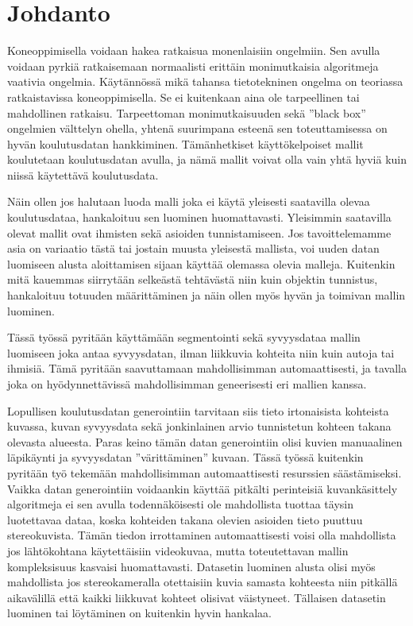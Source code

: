 \chapter{Johdanto}%
\label{ch:johdanto}

Koneoppimisella voidaan hakea ratkaisua monenlaisiin ongelmiin.
Sen avulla voidaan pyrkiä ratkaisemaan normaalisti erittäin monimutkaisia algoritmeja vaativia ongelmia.
Käytännössä mikä tahansa tietotekninen ongelma on teoriassa ratkaistavissa koneoppimisella.
Se ei kuitenkaan aina ole tarpeellinen tai mahdollinen ratkaisu.
Tarpeettoman monimutkaisuuden sekä ”black box” ongelmien välttelyn ohella,
yhtenä suurimpana esteenä sen toteuttamisessa on hyvän koulutusdatan hankkiminen.
Tämänhetkiset käyttökelpoiset mallit koulutetaan koulutusdatan avulla,
ja nämä mallit voivat olla vain yhtä hyviä kuin niissä käytettävä koulutusdata.

Näin ollen jos halutaan luoda malli joka ei käytä yleisesti saatavilla olevaa koulutusdataa,
hankaloituu sen luominen huomattavasti.
Yleisimmin saatavilla olevat mallit ovat ihmisten sekä asioiden tunnistamiseen.
Jos tavoittelemamme asia on variaatio tästä tai jostain muusta yleisestä mallista,
voi uuden datan luomiseen alusta aloittamisen sijaan käyttää olemassa olevia malleja.
Kuitenkin mitä kauemmas siirrytään selkeästä tehtävästä niin kuin objektin tunnistus,
hankaloituu totuuden määrittäminen ja näin ollen myös hyvän ja toimivan mallin luominen.

Tässä työssä pyritään käyttämään segmentointi sekä syvyysdataa mallin luomiseen joka antaa syvyysdatan,
ilman liikkuvia kohteita niin kuin autoja tai ihmisiä.
Tämä pyritään saavuttamaan mahdollisimman automaattisesti,
ja tavalla joka on hyödynnettävissä mahdollisimman geneerisesti eri mallien kanssa.

Lopullisen koulutusdatan generointiin tarvitaan siis tieto irtonaisista kohteista kuvassa,
kuvan syvyysdata sekä jonkinlainen arvio tunnistetun kohteen takana olevasta alueesta.
Paras keino tämän datan generointiin olisi kuvien manuaalinen läpikäynti ja syvyysdatan ”värittäminen” kuvaan.
Tässä työssä kuitenkin pyritään työ tekemään mahdollisimman automaattisesti resurssien säästämiseksi.
Vaikka datan generointiin voidaankin käyttää pitkälti perinteisiä kuvankäsittely algoritmeja ei sen avulla todennäköisesti ole mahdollista tuottaa täysin luotettavaa dataa,
koska kohteiden takana olevien asioiden tieto puuttuu stereokuvista.
Tämän tiedon irrottaminen automaattisesti voisi olla mahdollista jos lähtökohtana käytettäisiin videokuvaa,
mutta toteutettavan mallin kompleksisuus kasvaisi huomattavasti.
Datasetin luominen alusta olisi myös mahdollista jos stereokameralla otettaisiin kuvia samasta kohteesta niin pitkällä aikavälillä että kaikki liikkuvat kohteet olisivat väistyneet.
Tällaisen datasetin luominen tai löytäminen on kuitenkin hyvin hankalaa. 

